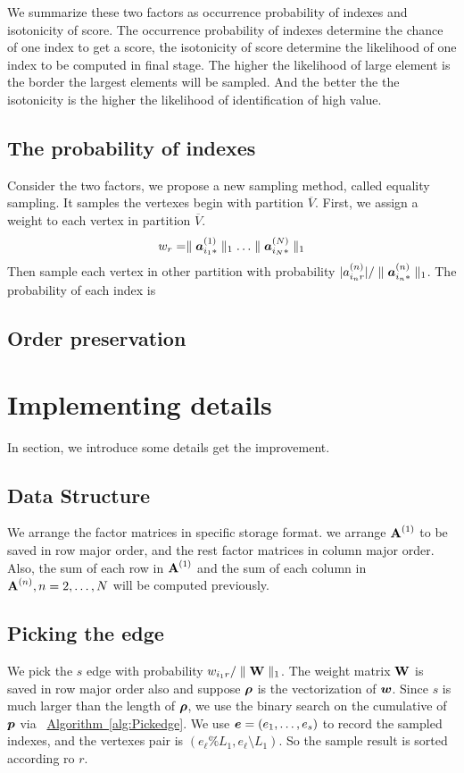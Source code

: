 \documentclass{article}
\newcommand{\Sca}[3]{{#1}^{(#2)}_{i_#2#3}}%
\newcommand{\V}[1]{{\bm{{\MakeLowercase{#1}}}}}%
\newcommand{\Varow}[1]{\V{a}^{(#1)}_{i_#1*}}
\newcommand{\M}[1]{{\bm{\mathbf{\MakeUppercase{#1}}}}}%
\newcommand{\Mn}[2]{\M{#1}^{(#2)}}%
\newcommand{\norm}[2]{\parallel#1\parallel_{#2}}
\newcommand{\Alg}[1]{\hyperref[alg:#1]{Algorithm~\ref*{alg:#1}}}
\begin{document}
We summarize these two factors as occurrence probability of indexes and isotonicity of score. The occurrence probability of indexes determine the chance of one index to get a score, the isotonicity of score determine the likelihood of one index to be computed in final stage. The higher the likelihood of large element is the border the largest elements will be sampled. And the better the the isotonicity is the higher the likelihood of identification of high value.
\subsection{The probability of indexes}
Consider the two factors, we propose a new sampling method, called equality sampling. It samples the vertexes begin with partition $\overline{V}$. First, we assign a weight to each vertex in partition $\overline{V}$.
\[
    w_r = \norm{\Varow{1}}{1}\ldots\norm{\Varow{N}}{1}
\]
Then sample each vertex in other partition with probability $|\Sca{a}{n}{r}|/\norm{\Varow{n}}{1}$. The probability of each index is 

\subsection{Order preservation}


\section{Implementing details}
In section, we introduce some details get the improvement.
\subsection{Data Structure}
We arrange the factor matrices in specific storage format. we arrange $\Mn{A}{1}$ to be saved in row major order, and the rest factor matrices in column major order. Also, the sum of each row in $\Mn{A}{1}$ and the sum of each column in $\Mn{A}{n},n=2,\ldots,N$ will be computed previously.

\subsection{Picking the edge}
We pick the $s$ edge with probability  $w_{i_1r}/\norm{\M{W}}{1}$. The weight matrix $\M{W}$ is saved in row major order also and suppose $\V{\rho}$ is the vectorization of $\V{W}$. Since $s$ is much larger than the length of $\V{\rho}$, we use the binary search on the cumulative of $\V{p}$ via ~\Alg{Pickedge}. We use $\V{e}=(e_1,\ldots,e_s)$ to record the sampled indexes, and the vertexes pair is $(e_{\ell}\%L_1,e_{\ell}\setminus L_1)$. So the sample result is sorted according ro $r$.
\end{document}

